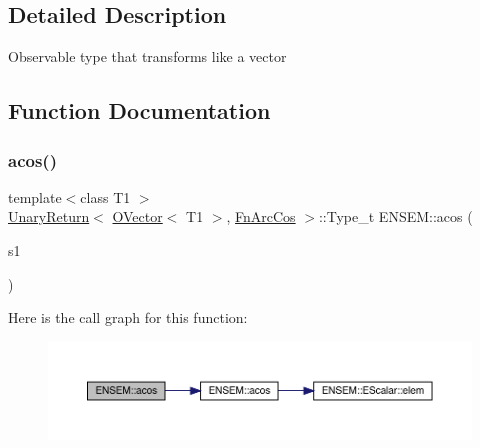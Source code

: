 \subsection{Detailed Description}
Observable type that transforms like a vector 

\subsection{Function Documentation}
\mbox{\label{group__obsvector_ga3b0e5ce4d5c52455bce825cd795a0363}} 
\subsubsection{\texorpdfstring{acos()}{acos()}}
{\footnotesize\ttfamily template$<$class T1 $>$ \\
\mbox{\hyperlink{structENSEM_1_1UnaryReturn}{Unary\+Return}}$<$ \mbox{\hyperlink{classENSEM_1_1OVector}{O\+Vector}}$<$ T1 $>$, \mbox{\hyperlink{structENSEM_1_1FnArcCos}{Fn\+Arc\+Cos}} $>$\+::Type\+\_\+t E\+N\+S\+E\+M\+::acos (\begin{DoxyParamCaption}\item[{const \mbox{\hyperlink{classENSEM_1_1OVector}{O\+Vector}}$<$ T1 $>$ \&}]{s1 }\end{DoxyParamCaption})\hspace{0.3cm}{\ttfamily [inline]}}

Here is the call graph for this function\+:\nopagebreak
\begin{figure}[H]
\begin{center}
\leavevmode
\includegraphics[width=350pt]{da/d59/group__obsvector_ga3b0e5ce4d5c52455bce825cd795a0363_cgraph}
\end{center}
\end{figure}
\mbox{\label{group__obsvector_gab801d265f143d9dca7ac1e3298640bf7}} 
